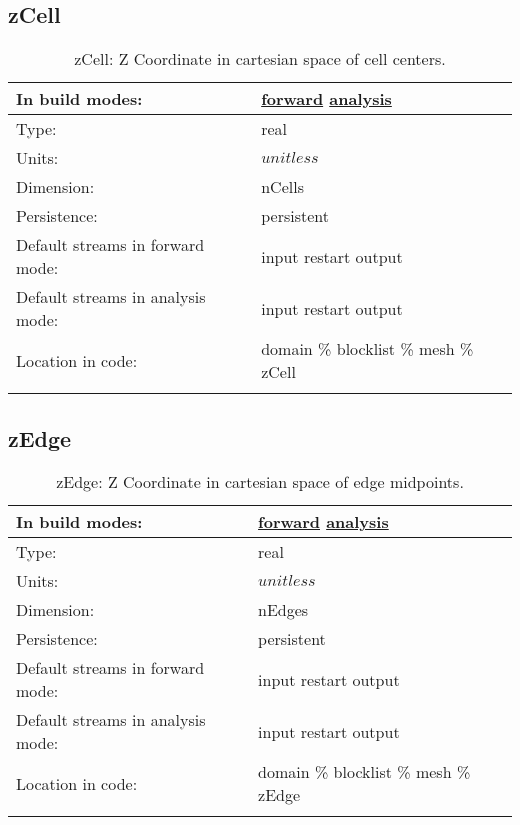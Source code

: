 \subsection[zCell]{zCell}
\label{subsec:var_sec_mesh_zCell}
\begin{center}
\begin{longtable}{| p{2.0in} | p{4.0in} |}
        \hline 
        In build modes: & \hyperref[subsec:forward_var_tab_mesh]{forward} \hyperref[subsec:analysis_var_tab_mesh]{analysis} \\
        \hline 
        Type: & real \\
        \hline 
        Units: & $unitless$ \\
        \hline 
        Dimension: & nCells \\
        \hline 
        Persistence: & persistent \\
        \hline 
		 Default streams in forward mode: &  input restart output \\
        \hline 
		 Default streams in analysis mode: &  input restart output \\
        \hline 
		 Location in code: & domain \% blocklist \% mesh \% zCell \\
		 \hline 
    \caption{zCell: Z Coordinate in cartesian space of cell centers.}
\end{longtable}
\end{center}
\subsection[zEdge]{zEdge}
\label{subsec:var_sec_mesh_zEdge}
\begin{center}
\begin{longtable}{| p{2.0in} | p{4.0in} |}
        \hline 
        In build modes: & \hyperref[subsec:forward_var_tab_mesh]{forward} \hyperref[subsec:analysis_var_tab_mesh]{analysis} \\
        \hline 
        Type: & real \\
        \hline 
        Units: & $unitless$ \\
        \hline 
        Dimension: & nEdges \\
        \hline 
        Persistence: & persistent \\
        \hline 
		 Default streams in forward mode: &  input restart output \\
        \hline 
		 Default streams in analysis mode: &  input restart output \\
        \hline 
		 Location in code: & domain \% blocklist \% mesh \% zEdge \\
		 \hline 
    \caption{zEdge: Z Coordinate in cartesian space of edge midpoints.}
\end{longtable}
\end{center}
